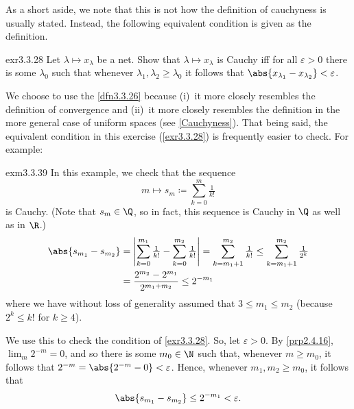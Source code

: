 As a short aside, we note that this is not how the definition of cauchyness is usually stated.  Instead, the following equivalent condition is given as the definition.
\begin{exr}{}{exr3.3.28}
Let $\lambda \mapsto x_\lambda$ be a net.  Show that $\lambda \mapsto x_\lambda$ is Cauchy iff for all $\varepsilon >0$ there is some $\lambda _0$ such that whenever $\lambda _1,\lambda _2\geq \lambda _0$ it follows that $\abs{x_{\lambda _1}-x_{\lambda _2}}<\varepsilon$.
\end{exr}
We choose to use the \cref{dfn3.3.26} because (i)~it more closely resembles the definition of convergence and (ii)~it more closely resembles the definition in the more general case of uniform spaces (see \cref{Cauchyness}).  That being said, the equivalent condition in this exercise (\cref{exr3.3.28}) is frequently easier to check.  For example:
\begin{exm}{}{exm3.3.39}
In this example, we check that the sequence
\begin{equation}
m\mapsto s_m\coloneqq \sum _{k=0}^m\tfrac{1}{k!}
\end{equation}
is Cauchy.  (Note that $s_m\in \Q$, so in fact, this sequence is Cauchy in $\Q$ as well as in $\R$.)
\begin{equation}
\begin{split}
\abs{s_{m_1}-s_{m_2
}} & =\left| \sum _{k=0}^{m_1}\tfrac{1}{k!}-\sum _{k=0}^{m_2}\tfrac{1}{k!}\right| =\sum _{k=m_1+1}^{m_2}\tfrac{1}{k!}\leq \sum _{k=m_1+1}^{m_2}\tfrac{1}{2^k} \\
& =\frac{2^{m_2}-2^{m_1}}{2^{m_1+m_2}}\leq 2^{-m_1}
\end{split}
\end{equation}
where we have without loss of generality assumed that $3\leq m_1\leq m_2$ (because $2^k\leq k!$ for $k\geq 4$).

We use this to check the condition of \cref{exr3.3.28}.  So, let $\varepsilon >0$.  By \cref{prp2.4.16}, $\lim _m2^{-m}=0$, and so there is some $m_0\in \N$ such that, whenever $m\geq m_0$, it follows that $2^{-m}=\abs{2^{-m}-0}<\varepsilon$.  Hence, whenever $m_1,m_2\geq m_0$, it follows that
\begin{equation}
\abs{s_{m_1}-s_{m_2}}\leq 2^{-m_1}<\varepsilon .
\end{equation}
\end{exm}

